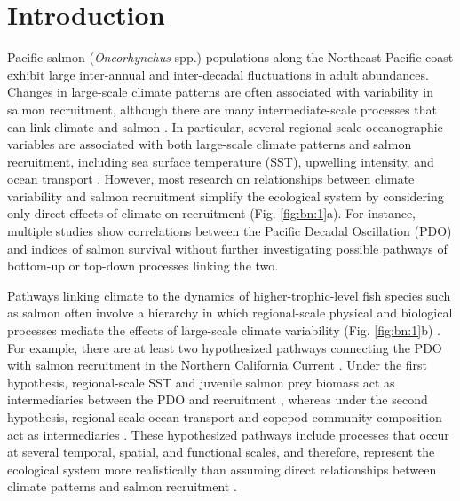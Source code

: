 \section{Introduction}

Pacific salmon (\emph{Oncorhynchus} spp.) populations along the Northeast
Pacific coast exhibit large inter-annual and inter-decadal fluctuations in adult
abundances. Changes in large-scale climate patterns are often associated with
variability in salmon recruitment, although there are many intermediate-scale
processes that can link climate and salmon \citep{Mueter2002a, Beamish2004b,
Drinkwater2010a, Malick2015a}. In particular, several regional-scale
oceanographic variables are associated with both large-scale climate patterns
and salmon recruitment, including sea surface temperature (SST), upwelling
intensity, and ocean transport \citep{King2011, Chavez2003a, Keister2011a}.
However, most research on relationships between climate variability and salmon
recruitment simplify the ecological system by considering only direct effects of
climate on recruitment (Fig. \ref{fig:bn:1}a). For instance, multiple studies show
correlations between the Pacific Decadal Oscillation (PDO) and indices of salmon
survival \citep{Mantua1997a, Burke2013, Malick2009a} without further
investigating possible pathways of bottom-up or top-down processes linking the
two.

Pathways linking climate to the dynamics of higher-trophic-level fish species
such as salmon often involve a hierarchy in which regional-scale physical and
biological processes mediate the effects of large-scale climate variability
(Fig. \ref{fig:bn:1}b) \citep{Drinkwater2010a, Ottersen2010a, Dippner2006}. For example,
there are at least two hypothesized pathways connecting the PDO with salmon
recruitment in the Northern California Current \citep{Wells2008a, Keister2011a}.
Under the first hypothesis, regional-scale SST and juvenile salmon prey biomass
act as intermediaries between the PDO and recruitment \citep{Daly2013,
Cole2000a}, whereas under the second hypothesis, regional-scale ocean transport
and copepod community composition act as intermediaries \citep{Bi2011a,
Keister2011a}. These hypothesized pathways include processes that occur at
several temporal, spatial, and functional scales, and therefore, represent the
ecological system more realistically than assuming direct relationships between
climate patterns and salmon recruitment \citep{Levin1992a, Ottersen2010a,
Bakun1996a, Hunt2002a}.

